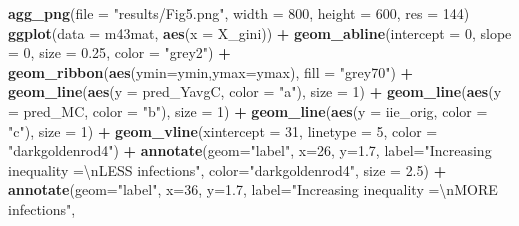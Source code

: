 \documentclass[
]{article}
\newenvironment{Shaded}{\begin{snugshade}}{\end{snugshade}}
\newcommand{\CharTok}[1]{\textcolor[rgb]{0.31,0.60,0.02}{#1}}
\newcommand{\DataTypeTok}[1]{\textcolor[rgb]{0.13,0.29,0.53}{#1}}
\newcommand{\DecValTok}[1]{\textcolor[rgb]{0.00,0.00,0.81}{#1}}
\newcommand{\FloatTok}[1]{\textcolor[rgb]{0.00,0.00,0.81}{#1}}
\newcommand{\KeywordTok}[1]{\textcolor[rgb]{0.13,0.29,0.53}{\textbf{#1}}}
\newcommand{\NormalTok}[1]{#1}
\newcommand{\OperatorTok}[1]{\textcolor[rgb]{0.81,0.36,0.00}{\textbf{#1}}}
\newcommand{\StringTok}[1]{\textcolor[rgb]{0.31,0.60,0.02}{#1}}
\begin{document}
\begin{Shaded}
\begin{Highlighting}[]
\KeywordTok{agg_png}\NormalTok{(}\DataTypeTok{file =} \StringTok{"results/Fig5.png"}\NormalTok{, }\DataTypeTok{width =} \DecValTok{800}\NormalTok{, }\DataTypeTok{height =} \DecValTok{600}\NormalTok{, }\DataTypeTok{res =} \DecValTok{144}\NormalTok{)}
\KeywordTok{ggplot}\NormalTok{(}\DataTypeTok{data =}\NormalTok{ m43mat, }\KeywordTok{aes}\NormalTok{(}\DataTypeTok{x =}\NormalTok{ X_gini)) }\OperatorTok{+}
\StringTok{  }\KeywordTok{geom_abline}\NormalTok{(}\DataTypeTok{intercept =} \DecValTok{0}\NormalTok{, }\DataTypeTok{slope =} \DecValTok{0}\NormalTok{, }\DataTypeTok{size =} \FloatTok{0.25}\NormalTok{, }\DataTypeTok{color =} \StringTok{"grey2"}\NormalTok{) }\OperatorTok{+}
\StringTok{  }\KeywordTok{geom_ribbon}\NormalTok{(}\KeywordTok{aes}\NormalTok{(}\DataTypeTok{ymin=}\NormalTok{ymin,}\DataTypeTok{ymax=}\NormalTok{ymax), }\DataTypeTok{fill =} \StringTok{"grey70"}\NormalTok{) }\OperatorTok{+}
\StringTok{  }\KeywordTok{geom_line}\NormalTok{(}\KeywordTok{aes}\NormalTok{(}\DataTypeTok{y =}\NormalTok{ pred_YavgC, }\DataTypeTok{color =} \StringTok{"a"}\NormalTok{), }\DataTypeTok{size =} \DecValTok{1}\NormalTok{) }\OperatorTok{+}
\StringTok{  }\KeywordTok{geom_line}\NormalTok{(}\KeywordTok{aes}\NormalTok{(}\DataTypeTok{y =}\NormalTok{ pred_MC, }\DataTypeTok{color =} \StringTok{"b"}\NormalTok{), }\DataTypeTok{size =} \DecValTok{1}\NormalTok{) }\OperatorTok{+}
\StringTok{  }\KeywordTok{geom_line}\NormalTok{(}\KeywordTok{aes}\NormalTok{(}\DataTypeTok{y =}\NormalTok{ iie_orig, }\DataTypeTok{color =} \StringTok{"c"}\NormalTok{), }\DataTypeTok{size =} \DecValTok{1}\NormalTok{) }\OperatorTok{+}
\StringTok{  }\KeywordTok{geom_vline}\NormalTok{(}\DataTypeTok{xintercept =} \DecValTok{31}\NormalTok{, }\DataTypeTok{linetype =} \DecValTok{5}\NormalTok{, }\DataTypeTok{color =} \StringTok{"darkgoldenrod4"}\NormalTok{) }\OperatorTok{+}
\StringTok{  }\KeywordTok{annotate}\NormalTok{(}\DataTypeTok{geom=}\StringTok{"label"}\NormalTok{, }\DataTypeTok{x=}\DecValTok{26}\NormalTok{, }\DataTypeTok{y=}\FloatTok{1.7}\NormalTok{, }\DataTypeTok{label=}\StringTok{"Increasing inequality =}\CharTok{\textbackslash{}n}\StringTok{LESS infections"}\NormalTok{,}
              \DataTypeTok{color=}\StringTok{"darkgoldenrod4"}\NormalTok{, }\DataTypeTok{size =} \FloatTok{2.5}\NormalTok{) }\OperatorTok{+}
\StringTok{  }\KeywordTok{annotate}\NormalTok{(}\DataTypeTok{geom=}\StringTok{"label"}\NormalTok{, }\DataTypeTok{x=}\DecValTok{36}\NormalTok{, }\DataTypeTok{y=}\FloatTok{1.7}\NormalTok{, }\DataTypeTok{label=}\StringTok{"Increasing inequality =}\CharTok{\textbackslash{}n}\StringTok{MORE infections"}\NormalTok{,}

\end{Highlighting}
\end{Shaded}
\end{document}
